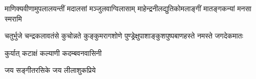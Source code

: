 

\fourlineindentedshloka
{माणिक्यवीणामुपलालयन्तीं}
{मदालसां मञ्जुलवाग्विलासाम्}
{माहेन्द्रनीलद्युतिकोमलाङ्गीं}
{मातङ्गकन्यां मनसा स्मरामि}

\twolineshloka
{चतुर्भुजे चन्द्रकलावतंसे कुचोन्नते कुङ्कुमरागशोणे}
{पुण्ड्रेक्षुपाशाङ्कुशपुष्पबाणहस्ते नमस्ते जगदेकमातः}

{कुर्यात् कटाक्षं कल्याणी कदम्बवनवासिनी}

{जय सङ्गीतरसिके जय लीलाशुकप्रिये}

